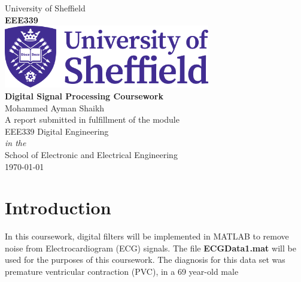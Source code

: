 \documentclass[11pt,oneside]{book}
\begin{document}
\setcounter{tocdepth}{0} 
\renewcommand\labelitemi{---}

\frontmatter

\begin{titlepage}
\begin{center}
{\LARGE University of Sheffield}\\[1.5cm]
\linespread{1.2}\Large {\bfseries EEE339}\\[2cm]
\linespread{1}
\includegraphics[width=9cm]{images/logo.png}\\[1.5cm]

\linespread{1.2}\Large {\bfseries Digital Signal Processing Coursework}\\[1cm]
{\Large Mohammed Ayman Shaikh}\\[1cm]
\large A report submitted in fulfillment of the module\\EEE339 Digital Engineering\\[0.3cm] 
\textit{in the}\\[0.3cm]
School of Electronic and Electrical Engineering\\[2cm]
\today
\end{center}

\end{titlepage}


\linespread{1.5}





\chapter{Introduction}
In this coursework, digital filters will be implemented in MATLAB to remove noise from 
Electrocardiogram (ECG) signals. The file \textbf{ECGData1.mat} will be used for the purposes of this coursework. The diagnosis for this data set was premature ventricular contraction (PVC), in a 69 year-old male
\end{document}
